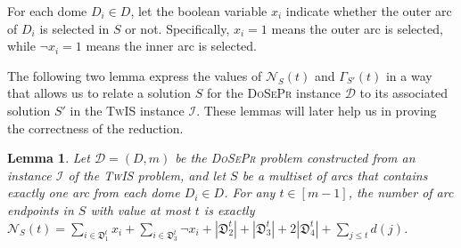 \documentclass[letterpaper,11pt]{article}
\newtheorem{lemma}[theorem]{Lemma}
\newcommand{\tis}{\textsc{TwIS}\xspace}
\newcommand{\dspr}{\textsc{DoSePr}\xspace}
\begin{document}
For each dome $D_i \in D$, let the boolean variable $x_i$ indicate whether the outer arc of $D_i$ is selected in $S$ or not. Specifically, $x_i = 1$ means the outer arc is selected, while $\neg{x_i} = 1$ means the inner arc is selected. 

The following two lemma express the values of $\mathcal{N}_S(t)$ and $\Gamma_{S'}(t)$ in a way that allows us to relate a solution $S$ for the \dspr instance $\mathcal{D}$ to its associated solution $S'$ in the \tis instance $\mathcal{I}$. These lemmas will later help us in proving the correctness of the reduction. 

\begin{lemma}
\label{lemma:tool:TIS2DOME}
Let $\mathcal{D}=(D,m)$ be the \dspr problem constructed from an instance $\mathcal{I}$ of the \tis problem, and let $S$ be a multiset of arcs that contains exactly one arc from each dome $D_i \in D$. For any $t\in[m-1]$, the number of arc endpoints in $S$ with value at most $t$ is exactly $\mathcal{N}_S(t) = \sum_{i \in \mathfrak{D}_1^t} x_i + \sum_{i \in \mathfrak{D}_3^t} \neg{x_i} +|\mathfrak{D}_2^t| +|\mathfrak{D}_3^t| + 2|\mathfrak{D}_4^t| + \sum_{j \leq t} d(j)$.
\end{lemma}
\end{document}

